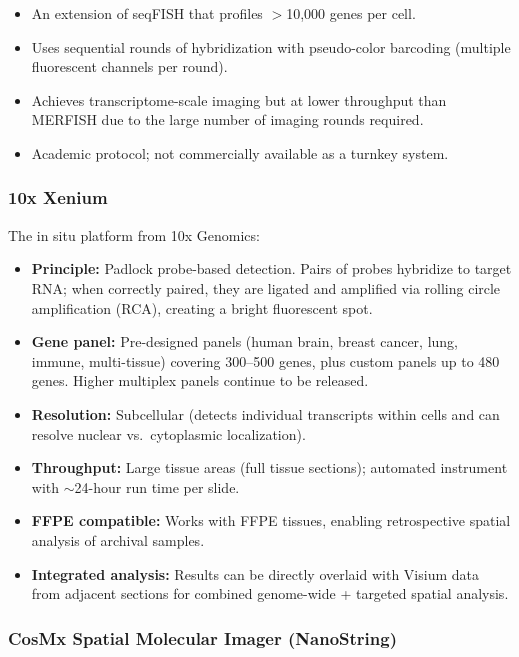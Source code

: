 \begin{itemize}[nosep]
  \item An extension of seqFISH that profiles $>$10,000 genes per cell.
  \item Uses sequential rounds of hybridization with pseudo-color barcoding
    (multiple fluorescent channels per round).
  \item Achieves transcriptome-scale imaging but at lower throughput than
    MERFISH due to the large number of imaging rounds required.
  \item Academic protocol; not commercially available as a turnkey system.
\end{itemize}

\subsubsection{10x Xenium}

The in situ platform from 10x Genomics:

\begin{itemize}[nosep]
  \item \textbf{Principle:} Padlock probe-based detection. Pairs of probes
    hybridize to target RNA; when correctly paired, they are ligated and
    amplified via rolling circle amplification (RCA), creating a bright
    fluorescent spot.
  \item \textbf{Gene panel:} Pre-designed panels (human brain, breast cancer,
    lung, immune, multi-tissue) covering 300--500 genes, plus custom panels
    up to 480 genes. Higher multiplex panels continue to be released.
  \item \textbf{Resolution:} Subcellular (detects individual transcripts within
    cells and can resolve nuclear vs.\ cytoplasmic localization).
  \item \textbf{Throughput:} Large tissue areas (full tissue sections);
    automated instrument with $\sim$24-hour run time per slide.
  \item \textbf{FFPE compatible:} Works with FFPE tissues, enabling retrospective
    spatial analysis of archival samples.
  \item \textbf{Integrated analysis:} Results can be directly overlaid with
    Visium data from adjacent sections for combined genome-wide + targeted
    spatial analysis.
\end{itemize}

\subsubsection{CosMx Spatial Molecular Imager (NanoString)}


